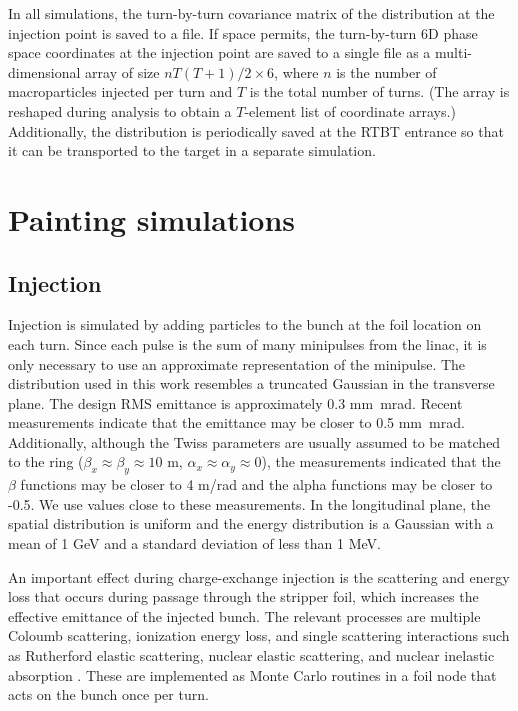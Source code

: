 In all simulations, the turn-by-turn covariance matrix of the distribution at the injection point is saved to a file. If space permits, the turn-by-turn 6D phase space coordinates at the injection point are saved to a single file as a multi-dimensional array of size $n T (T + 1) / 2 \times 6$, where $n$ is the number of macroparticles injected per turn and $T$ is the total number of turns. (The array is reshaped during analysis to obtain a $T$-element list of coordinate arrays.) Additionally, the distribution is periodically saved at the RTBT entrance so that it can be transported to the target in a separate simulation.





\section{Painting simulations}

\subsection{Injection}

Injection is simulated by adding particles to the bunch at the foil location on each turn. Since each pulse is the sum of many minipulses from the linac, it is only necessary to use an approximate representation of the minipulse. The distribution used in this work resembles a truncated Gaussian in the transverse plane. The design RMS emittance is approximately 0.3 mm~mrad. Recent measurements indicate that the emittance may be closer to 0.5 mm~mrad. Additionally, although the Twiss parameters are usually assumed to be matched to the ring ($\beta_x \approx \beta_y \approx 10$ m, $\alpha_x \approx \alpha_y \approx 0$), the measurements indicated that the $\beta$ functions may be closer to 4 m/rad and the alpha functions may be closer to -0.5. We use values close to these measurements. In the longitudinal plane, the spatial distribution is uniform and the energy distribution is a Gaussian with a mean of 1 GeV and a standard deviation of less than 1 MeV.

An important effect during charge-exchange injection is the scattering and energy loss that occurs during passage through the stripper foil, which increases the effective emittance of the injected bunch. The relevant processes are multiple Coloumb scattering, ionization energy loss, and single scattering interactions such as Rutherford elastic scattering, nuclear elastic scattering, and nuclear inelastic absorption \cite{Chao2012, Cousineau2003}. These are implemented as Monte Carlo routines in a foil node that acts on the bunch once per turn.

